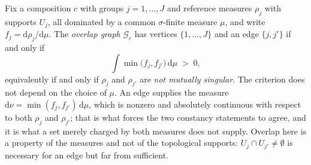 
\begin{definition}
\label{def:overlap}
Fix a composition $c$ with groups $j = 1,\dots,J$ and reference measures $\rho_j$ with supports
$U_j$, all dominated by a common $\sigma$-finite measure $\mu$, and write
$f_j = \mathrm{d}\rho_j/\mathrm{d}\mu$. The \emph{overlap graph} $\mathcal{G}_c$ has vertices
$\{1,\dots,J\}$ and an edge $\{j,j'\}$ if and only if
\begin{equation}
  \int \min\bigl(f_j, f_{j'}\bigr)\,\mathrm{d}\mu \;>\; 0 ,
  \label{eq:overlap}
\end{equation}
equivalently if and only if $\rho_j$ and $\rho_{j'}$ are \emph{not mutually singular}. The
criterion does not depend on the choice of $\mu$. An edge supplies the measure
$\mathrm{d}\nu = \min(f_j,f_{j'})\,\mathrm{d}\mu$, which is nonzero and absolutely continuous
with respect to both $\rho_j$ and $\rho_{j'}$; that is what forces the two constancy statements to
agree, and it is what a set merely charged by both measures does not supply. Overlap here is a
property of the measures and not of the topological supports: $U_j \cap U_{j'} \neq \emptyset$ is
necessary for an edge but far from sufficient.
\end{definition}

